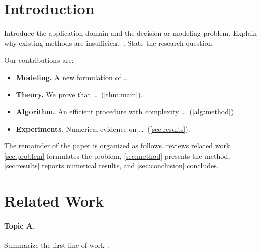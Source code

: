 
\section{Introduction}\label{sec:intro}
Introduce the application domain and the decision or modeling problem. Explain why existing methods are insufficient~\citep{boyd2004convex,nocedal2006numerical}. State the research question.


Our contributions are:
\begin{itemize}
  \item \textbf{Modeling.} A new formulation of \ldots
  \item \textbf{Theory.} We prove that \ldots\ (\cref{thm:main}).
  \item \textbf{Algorithm.} An efficient procedure with complexity \ldots\ (\cref{alg:method}).
  \item \textbf{Experiments.} Numerical evidence on \ldots\ (\cref{sec:results}).
\end{itemize}
The remainder of the paper is organized as follows.  reviews related work, \cref{sec:problem} formulates the problem, \cref{sec:method} presents the method, \cref{sec:results} reports numerical results, and \cref{sec:conclusion} concludes.

\section{Related Work}\label{sec:related}
\paragraph{Topic A.} Summarize the first line of work~\citep{tibshirani1996regression}.

